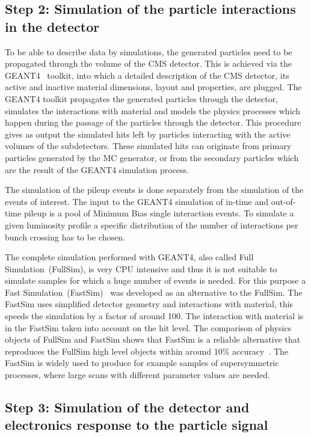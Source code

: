 \subsection{Step 2: Simulation of the particle interactions in the detector}

To be able to describe data by simulations, the generated particles need to be propagated through the volume of the CMS detector. This is achieved via the GEANT4~\cite{Agostinelli:2002hh, Lefebure:1999wja} toolkit, into which a detailed description of the CMS detector, its active and inactive material dimensions, layout and properties, are plugged. The GEANT4 toolkit propagates the generated particles through the detector, simulates the interactions with material and models the physics processes which happen during the passage of the particles through the detector. This procedure gives as output the simulated hits left by particles interacting with the active volumes of the subdetectors. These simulated hits can originate from primary particles generated by the MC generator, or from the secondary particles which are the result of the GEANT4 simulation process.

The simulation of the pileup events is done separately from the simulation of the events of interest. The input to the GEANT4 simulation of in-time and out-of-time pileup is a pool of Minimum Bias single interaction events. To simulate a given luminosity profile a specific distribution of the number of interactions per bunch crossing has to be chosen. 


The complete simulation performed with GEANT4, also called Full Simulation~(FullSim), is very CPU intensive and thus it is not suitable to simulate samples for which a huge number of events is needed. For this purpose a Fast Simulation~(FastSim)~\cite{Sekmen:2017hzs, CMS:2010spa, Giammanco:2014bza} was developed as an alternative to the FullSim. The FastSim uses simplified detector geometry and interactions with material, this speeds the simulation by a factor of around 100. The interaction with material is in the FastSim taken into account on the hit level. The comparison of physics objects of FullSim and FastSim shows that FastSim is a reliable alternative that reproduces the FullSim high level objects within around 10\% accuracy~\cite{Sekmen:2017hzs, Abdullin:2011zz}. The FastSim is widely used to produce for example samples of supersymmetric processes, where large scans with different parameter values are needed.

\subsection{Step 3: Simulation of the detector and electronics response to the particle signal}

